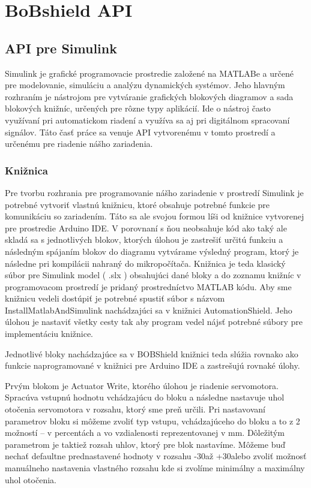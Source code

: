 \chapter{BoBshield API}
\label{kap:3}


\section{API pre Simulink}
\label{kap:3.2}

Simulink je grafické programovacie prostredie založené na MATLABe a určené pre modelovanie, simuláciu a analýzu dynamických systémov.  Jeho hlavným rozhraním je nástrojom pre vytváranie grafických blokových diagramov a sada blokových knižníc, určených pre rôzne typy aplikácií. Ide o nástroj často využívaní pri automatickom riadení a využíva sa aj pri digitálnom spracovaní signálov. Táto časť práce sa venuje API vytvorenému v tomto prostredí a určenému pre riadenie nášho zariadenia. 

\subsection{Knižnica}
\label{kap:3.2.1}
Pre tvorbu rozhrania pre programovanie nášho zariadenie v prostredí Simulink je potrebné vytvoriť vlastnú knižnicu, ktoré obsahuje potrebné funkcie pre komunikáciu so zariadením. Táto sa ale svojou formou líši od knižnice vytvorenej pre prostredie Arduino IDE. V porovnaní s ňou neobsahuje kód ako taký ale skladá sa s jednotlivých blokov, ktorých úlohou je zastrešiť určitú funkciu a následným spájaním blokov do diagramu vytvárame výsledný program, ktorý je následne pri kompilácii nahraný do mikropočítača. Knižnica je teda klasický súbor pre Simulink model ( .slx ) obsahujúci dané bloky a do zoznamu knižníc v programovacom prostredí je pridaný prostredníctvo MATLAB kódu. Aby sme knižnicu vedeli dostúpiť je potrebné spustiť súbor s názvom InstallMatlabAndSimulink nachádzajúci sa v knižnici AutomationShield. Jeho úlohou je nastaviť všetky cesty tak aby program vedel nájsť potrebné súbory pre implementáciu knižnice. 

Jednotlivé bloky nachádzajúce sa v BOBShield knižnici teda slúžia rovnako ako funkcie naprogramované v knižnici pre Arduino IDE a zastrešujú rovnaké úlohy.

Prvým blokom je Actuator Write, ktorého úlohou je riadenie servomotora. Spracúva vstupnú hodnotu vchádzajúcu do bloku a následne nastavuje uhol otočenia servomotora v rozsahu, ktorý sme preň určili. Pri nastavovaní parametrov bloku si môžeme zvoliť typ vstupu, vchádzajúceho do bloku a to z 2 možností – v percentách a vo vzdialenosti reprezentovanej v mm.  Dôležitým parametrom je taktiež rozsah uhlov, ktorý pre blok nastavíme. Môžeme buď nechať defaultne prednastavené hodnoty v rozsahu -30\degree až +30\degree alebo zvoliť možnosť manuálneho nastavenia vlastného rozsahu kde si zvolíme minimálny a maximálny uhol otočenia.

